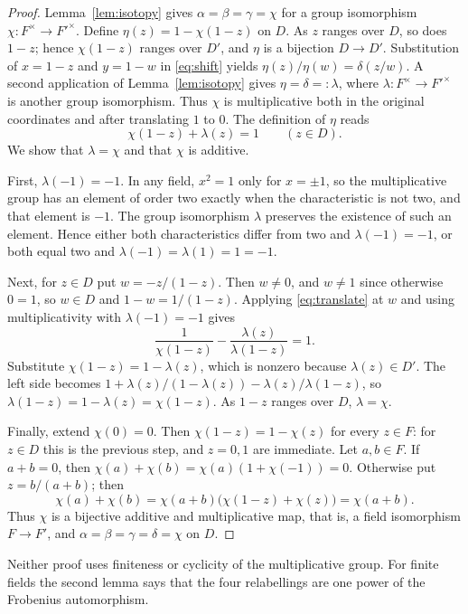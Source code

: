 \documentclass[11pt]{article}
\theoremstyle{definition}
\theoremstyle{remark}
\begin{document}
\begin{proof}
Lemma~\ref{lem:isotopy} gives
$\alpha=\beta=\gamma=\chi$ for a group isomorphism
$\chi:F^\times\to F'^\times$.
Define $\eta(z)=1-\chi(1-z)$ on $D$. As $z$ ranges over $D$, so does
$1-z$; hence $\chi(1-z)$ ranges over $D'$, and $\eta$ is a bijection
$D\to D'$. Substitution of $x=1-z$ and $y=1-w$
in \eqref{eq:shift} yields $\eta(z)/\eta(w)=\delta(z/w)$.  A second
application of Lemma~\ref{lem:isotopy} gives $\eta=\delta=:\lambda$, where
$\lambda:F^\times\to F'^\times$ is another group isomorphism. Thus $\chi$ is
multiplicative both in the original coordinates and after translating
$1$ to $0$. The definition of $\eta$ reads
\begin{equation}
 \chi(1-z)+\lambda(z)=1\qquad(z\in D).
 \label{eq:translate}
\end{equation}
We show that $\lambda=\chi$ and that $\chi$ is additive.

First, $\lambda(-1)=-1$. In any field, $x^2=1$ only for $x=\pm1$, so
the multiplicative group has an element of order two exactly when the
characteristic is not two, and that element is $-1$. The group
isomorphism $\lambda$ preserves the existence of such an element. Hence
either both characteristics differ from two and $\lambda(-1)=-1$, or
both equal two and $\lambda(-1)=\lambda(1)=1=-1$.

Next, for $z\in D$ put $w=-z/(1-z)$. Then $w\ne0$, and $w\ne1$ since
otherwise $0=1$, so $w\in D$ and $1-w=1/(1-z)$. Applying
\eqref{eq:translate} at $w$ and using multiplicativity with
$\lambda(-1)=-1$ gives
\[
 \frac{1}{\chi(1-z)}-\frac{\lambda(z)}{\lambda(1-z)}=1.
\]
Substitute $\chi(1-z)=1-\lambda(z)$, which is nonzero because
$\lambda(z)\in D'$. The left side becomes
$1+\lambda(z)/(1-\lambda(z))-\lambda(z)/\lambda(1-z)$, so
$\lambda(1-z)=1-\lambda(z)=\chi(1-z)$. As $1-z$ ranges over $D$,
$\lambda=\chi$.

Finally, extend $\chi(0)=0$. Then $\chi(1-z)=1-\chi(z)$ for every
$z\in F$: for $z\in D$ this is the previous step, and $z=0,1$ are
immediate. Let $a,b\in F$. If $a+b=0$, then
$\chi(a)+\chi(b)=\chi(a)(1+\chi(-1))=0$. Otherwise put $z=b/(a+b)$; then
\[
 \chi(a)+\chi(b)=\chi(a+b)\bigl(\chi(1-z)+\chi(z)\bigr)=\chi(a+b).
\]
Thus $\chi$ is a bijective additive and multiplicative map, that is, a
field isomorphism $F\to F'$, and $\alpha=\beta=\gamma=\delta=\chi$ on $D$.
\end{proof}

Neither proof uses finiteness or cyclicity of the multiplicative group.
For finite fields the second lemma says that the four relabellings are
one power of the Frobenius automorphism.
\end{document}
